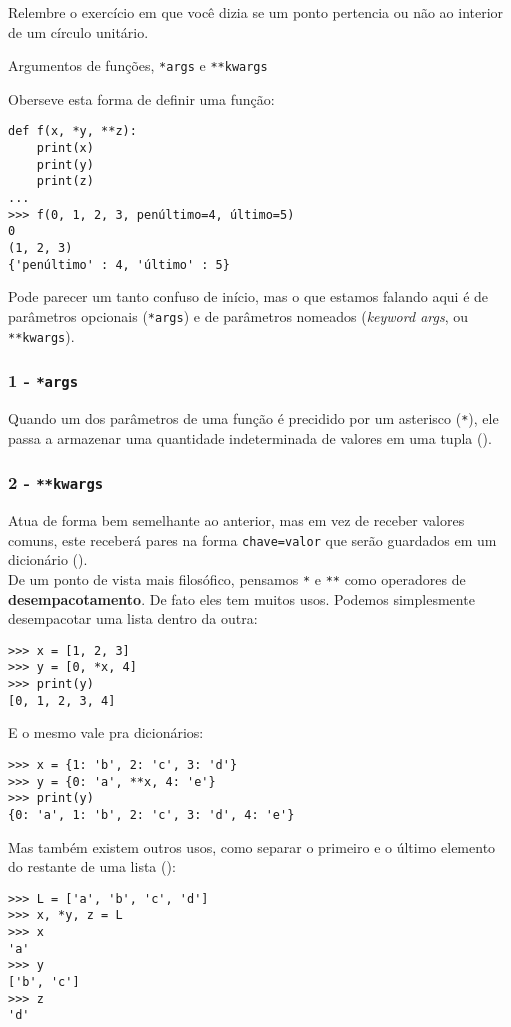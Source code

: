        \clue Relembre o exercício em que você dizia se um ponto pertencia ou não ao interior de um círculo unitário.

	
	\begin{interlude}{Argumentos de funções, \texttt{*args} e \texttt{**kwargs}}
	
	Oberseve esta forma de definir uma função:
	\begin{lstlisting}
def f(x, *y, **z):
	print(x)
	print(y)
	print(z)
...
>>> f(0, 1, 2, 3, penúltimo=4, último=5)
0
(1, 2, 3)
{'penúltimo' : 4, 'último' : 5}
	\end{lstlisting}
	
	Pode parecer um tanto confuso de início, mas o que estamos falando aqui é de parâmetros opcionais (\texttt{*args}) e de parâmetros nomeados (\textit{keyword args}, ou \texttt{**kwargs}).
	
	\subsubsection*{1 - \texttt{*args}}
	
	Quando um dos parâmetros de uma função é precidido por um asterisco (\texttt{*}), ele passa a armazenar uma quantidade indeterminada de valores em uma tupla ().
	
	\subsubsection*{2 - \texttt{**kwargs}}
	
	Atua de forma bem semelhante ao anterior, mas em vez de receber valores comuns, este receberá pares na forma \texttt{chave=valor} que serão guardados em um dicionário ().\\
	
	De um ponto de vista mais filosófico, pensamos \texttt{*} e \texttt{**} como operadores de \textbf{desempacotamento}. De fato eles tem muitos usos. Podemos simplesmente desempacotar uma lista dentro da outra:
	
	\begin{lstlisting}
>>> x = [1, 2, 3]
>>> y = [0, *x, 4]
>>> print(y)
[0, 1, 2, 3, 4]
	\end{lstlisting}
	
	E o mesmo vale pra dicionários:
	
	\begin{lstlisting}
>>> x = {1: 'b', 2: 'c', 3: 'd'}
>>> y = {0: 'a', **x, 4: 'e'}
>>> print(y)
{0: 'a', 1: 'b', 2: 'c', 3: 'd', 4: 'e'}
	\end{lstlisting}
	
	Mas também existem outros usos, como separar o primeiro e o último elemento do restante de uma lista ():
	
	\begin{lstlisting}
>>> L = ['a', 'b', 'c', 'd']
>>> x, *y, z = L
>>> x
'a'
>>> y
['b', 'c']
>>> z
'd' 
	\end{lstlisting}
	
	\end{interlude}
	
